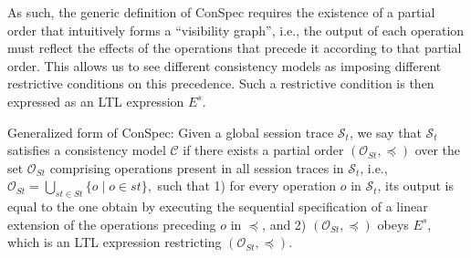 \documentclass[acmlarge, ,11pt]{acmart}
\begin{document}
As such, the generic definition of ConSpec requires the existence of a partial order that intuitively forms a ``visibility graph'', i.e., the output of each operation must reflect the effects of the operations that precede it according to that partial order. This allows us to see different consistency models as imposing different restrictive conditions on this precedence.
 Such a
  restrictive condition is then expressed as an LTL expression $E^s$.
 \begin{definition}{Generalized form of ConSpec:}\label{def:form0}
Given a global session trace $\mathcal{S}_t$,
we say  that $\mathcal{S}_t$ satisfies a consistency model $\mathcal{C}$
if there exists a partial order $\left( {\mathcal{O}_{St}}, \preccurlyeq \right)$ over the set ${\mathcal{O}_{St}}$ comprising operations  present in all session traces in $\mathcal{S}_t$, i.e.,  ${\mathcal{O}_{St}} = \bigcup_{st \in St} \{ o \mid o \in st \},$
 such that 1) for every operation $\mathit{o}$ in $\mathcal{S}_t$, its output is equal to the one obtain by executing the sequential specification of a linear extension of the operations preceding $\mathit{o}$ in $\preccurlyeq$,
 and 2) $\left( {\mathcal{O}_{St}}, \preccurlyeq \right)$ obeys $E^s$, which is an LTL expression restricting $\left( {\mathcal{O}_{St}}, \preccurlyeq \right)$.
\end{definition}

\end{document}
